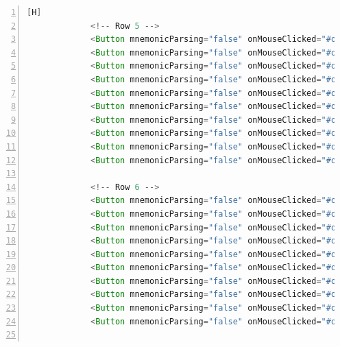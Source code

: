 \documentclass{article}
\begin{document}
\begin{lstlisting}[language=java,caption={Archivo FXML}, numbers=left][H]
             <!-- Row 5 -->
             <Button mnemonicParsing="false" onMouseClicked="#onButtonClick" styleClass="button" text="" GridPane.columnIndex="0" GridPane.rowIndex="5" />
             <Button mnemonicParsing="false" onMouseClicked="#onButtonClick" styleClass="button" text="" GridPane.columnIndex="1" GridPane.rowIndex="5" />
             <Button mnemonicParsing="false" onMouseClicked="#onButtonClick" styleClass="button" text="" GridPane.columnIndex="2" GridPane.rowIndex="5" />
             <Button mnemonicParsing="false" onMouseClicked="#onButtonClick" styleClass="button" text="" GridPane.columnIndex="3" GridPane.rowIndex="5" />
             <Button mnemonicParsing="false" onMouseClicked="#onButtonClick" styleClass="button" text="" GridPane.columnIndex="4" GridPane.rowIndex="5" />
             <Button mnemonicParsing="false" onMouseClicked="#onButtonClick" styleClass="button" text="" GridPane.columnIndex="5" GridPane.rowIndex="5" />
             <Button mnemonicParsing="false" onMouseClicked="#onButtonClick" styleClass="button" text="" GridPane.columnIndex="6" GridPane.rowIndex="5" />
             <Button mnemonicParsing="false" onMouseClicked="#onButtonClick" styleClass="button" text="" GridPane.columnIndex="7" GridPane.rowIndex="5" />
             <Button mnemonicParsing="false" onMouseClicked="#onButtonClick" styleClass="button" text="" GridPane.columnIndex="8" GridPane.rowIndex="5" />
             <Button mnemonicParsing="false" onMouseClicked="#onButtonClick" styleClass="button" text="" GridPane.columnIndex="9" GridPane.rowIndex="5" />

             <!-- Row 6 -->
             <Button mnemonicParsing="false" onMouseClicked="#onButtonClick" styleClass="button" text="" GridPane.columnIndex="0" GridPane.rowIndex="6" />
             <Button mnemonicParsing="false" onMouseClicked="#onButtonClick" styleClass="button" text="" GridPane.columnIndex="1" GridPane.rowIndex="6" />
             <Button mnemonicParsing="false" onMouseClicked="#onButtonClick" styleClass="button" text="" GridPane.columnIndex="2" GridPane.rowIndex="6" />
             <Button mnemonicParsing="false" onMouseClicked="#onButtonClick" styleClass="button" text="" GridPane.columnIndex="3" GridPane.rowIndex="6" />
             <Button mnemonicParsing="false" onMouseClicked="#onButtonClick" styleClass="button" text="" GridPane.columnIndex="4" GridPane.rowIndex="6" />
             <Button mnemonicParsing="false" onMouseClicked="#onButtonClick" styleClass="button" text="" GridPane.columnIndex="5" GridPane.rowIndex="6" />
             <Button mnemonicParsing="false" onMouseClicked="#onButtonClick" styleClass="button" text="" GridPane.columnIndex="6" GridPane.rowIndex="6" />
             <Button mnemonicParsing="false" onMouseClicked="#onButtonClick" styleClass="button" text="" GridPane.columnIndex="7" GridPane.rowIndex="6" />
             <Button mnemonicParsing="false" onMouseClicked="#onButtonClick" styleClass="button" text="" GridPane.columnIndex="8" GridPane.rowIndex="6" />
             <Button mnemonicParsing="false" onMouseClicked="#onButtonClick" styleClass="button" text="" GridPane.columnIndex="9" GridPane.rowIndex="6" />


\end{lstlisting}
\end{document}
